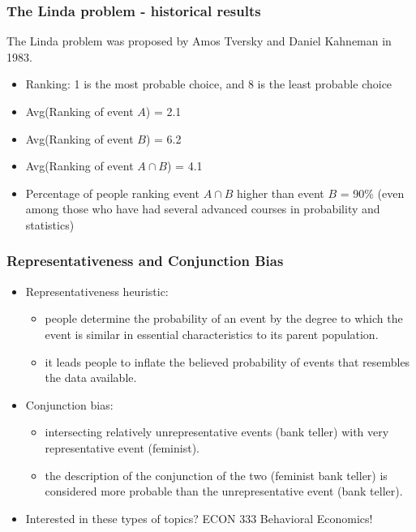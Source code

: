 \documentclass[slidestop,compress,mathserif]{beamer}
\begin{document}
\begin{frame}\frametitle{The Linda problem - historical results}
The Linda problem was proposed by Amos Tversky and Daniel Kahneman in 1983.
\begin{itemize}
\item Ranking: 1 is the most probable choice, and 8 is the least probable choice
\item Avg(Ranking of event $A$) = 2.1
\item Avg(Ranking of event $B$) = 6.2
\item Avg(Ranking of event $A \cap B$) = 4.1
\item Percentage of people ranking event $A \cap B$ higher than event $B$ = 90\% (even among those who have had several advanced courses in probability and statistics)
\end{itemize}

\end{frame}


\begin{frame}\frametitle{Representativeness and Conjunction Bias}

\begin{itemize}
\item Representativeness heuristic:
\begin{itemize}
\item people determine the probability of an event by the degree to which the event is similar in essential characteristics to its parent population.
\item it leads people to inflate the believed probability of events that resembles the data available.
\end{itemize}

\pause

\item Conjunction bias:
\begin{itemize}
\item intersecting relatively unrepresentative events (bank teller) with very representative event (feminist).
\item the description of the conjunction of the two (feminist bank teller) is considered more probable than the unrepresentative event (bank teller).
\end{itemize}

\pause

\item Interested in these types of topics? ECON 333 Behavioral Economics!
\end{itemize}


\end{frame}
\end{document}

